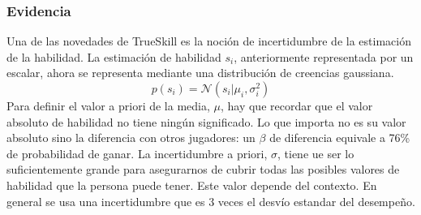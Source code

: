 \documentclass[a4paper,11pt]{book}
\newcommand{\N}{\mathcal{N}}
\theoremstyle{definition}
\begin{document}
\subsubsection{Evidencia}

Una de las novedades de TrueSkill es la noción de incertidumbre de la estimación de la habilidad.
%
La estimación de habilidad $s_i$, anteriormente representada por un escalar, ahora se representa mediante una distribución de creencias gaussiana.
%
\begin{equation}
p(s_i) = \N(s_i | \mu_i, \sigma_i^2)
\end{equation}
%
Para definir el valor a priori de la media, $\mu$, hay que recordar que el valor absoluto de habilidad no tiene ningún significado.
%
Lo que importa no es su valor absoluto sino la diferencia con otros jugadores: un $\beta$ de diferencia equivale a 76\% de probabilidad de ganar.
%
La incertidumbre a priori, $\sigma$, tiene ue ser lo suficientemente grande para asegurarnos de cubrir todas las posibles valores de habilidad que la persona puede tener.
%
Este valor depende del contexto.
%
En general se usa una incertidumbre que es 3 veces el desvío estandar del desempeño.

\end{document}
